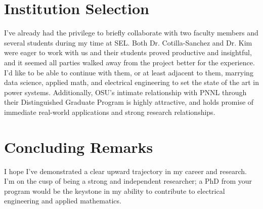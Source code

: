\documentclass[letterpaper]{article}
\begin{document}
\section*{Institution Selection}
I've already had the privilege to briefly collaborate with two faculty members
and several students during my time at SEL. Both Dr. Cotilla-Sanchez and Dr. Kim were
eager to work with us and their students proved productive and insightful, and it seemed
all parties walked away from the project better for the experience. I'd like to be
able to continue with them, or at least adjacent to them, marrying data science, applied math,
and electrical engineering to set the state of the art in power systems. Additionally,
OSU's intimate relationship with PNNL through their Distinguished Graduate Program is highly
attractive, and holds promise of immediate real-world applications and strong research
relationships.

\section*{Concluding Remarks}
I hope I've demonstrated a clear upward trajectory in my career and research.
I'm on the cusp of being a strong and independent researcher; a PhD from your program
would be the keystone in my ability to contribute to electrical engineering and applied
mathematics.
\end{document}
